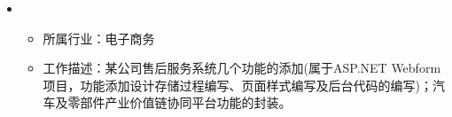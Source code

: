   \begin{itemize}[leftmargin=*]
    \item
      {\small
      \begin{itemize}
        \item 所属行业：电子商务
        \item 工作描述：某公司售后服务系统几个功能的添加(属于ASP.NET Webform 项目，功能添加设计存储过程编写、页面样式编写及后台代码的编写)；汽车及零部件产业价值链协同平台功能的封装。
      \end{itemize}
      }
  \end{itemize}